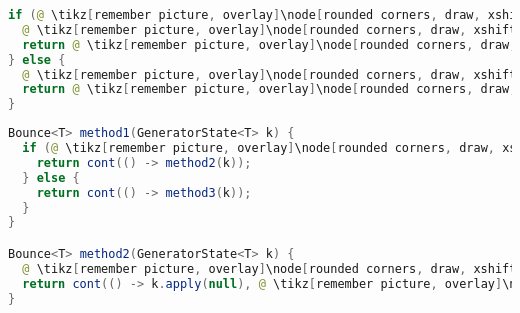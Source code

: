\begin{center}
\begin{mdframed}
\begin{minipage}[t]{0.4\textwidth}
\begin{lstlisting}[language=Java, numbers=none, breaklines=true]
if (@ \tikz[remember picture, overlay]\node[rounded corners, draw, xshift=-0.1cm, inner sep=5pt, anchor=west, yshift=0.1cm] {Feltétel}; \hspace*{1.04cm} \vspace*{0.3cm} @) {
  @ \tikz[remember picture, overlay]\node[rounded corners, draw, xshift=-0.1cm, inner sep=5pt, anchor=west] {Kódrészlet \#1}; \vspace*{0.5cm} @ 
  return @ \tikz[remember picture, overlay]\node[rounded corners, draw, xshift=-0.1cm, inner sep=5pt, anchor=west, yshift=0.1cm] {Kifejezés \#1}; \vspace*{0.3cm} @
} else {
  @ \tikz[remember picture, overlay]\node[rounded corners, draw, xshift=-0.1cm, inner sep=5pt, anchor=west] {Kódrészlet \#2}; \vspace*{0.5cm} @ 
  return @ \tikz[remember picture, overlay]\node[rounded corners, draw, xshift=-0.1cm, inner sep=5pt, anchor=west, yshift=0.1cm] {Kifejezés \#2}; \vspace*{0.3cm} @
}
\end{lstlisting}
\end{minipage} 
\begin{minipage}[t]{0.6\textwidth}
\begin{lstlisting}[language=Java, numbers=none, breaklines=true]
Bounce<T> method1(GeneratorState<T> k) {
  if (@ \tikz[remember picture, overlay]\node[rounded corners, draw, xshift=-0.1cm, inner sep=5pt, anchor=west, yshift=0.1cm] {Feltétel}; \hspace*{1.04cm} @) {
    return cont(() -> method2(k));
  } else {
    return cont(() -> method3(k));
  }
}

Bounce<T> method2(GeneratorState<T> k) {
  @ \tikz[remember picture, overlay]\node[rounded corners, draw, xshift=-0.1cm, inner sep=5pt, anchor=west] {Kódrészlet \#1}; \vspace*{0.3cm} @
  return cont(() -> k.apply(null), @ \tikz[remember picture, overlay]\node[rounded corners, draw, xshift=-0.1cm, inner sep=5pt, anchor=west, yshift=0.1cm] {Kifejezés \#1}; \vspace*{0.2cm} \hspace*{1.75cm} @);
}


\end{lstlisting}
\end{minipage}
\end{mdframed}
\end{center}
